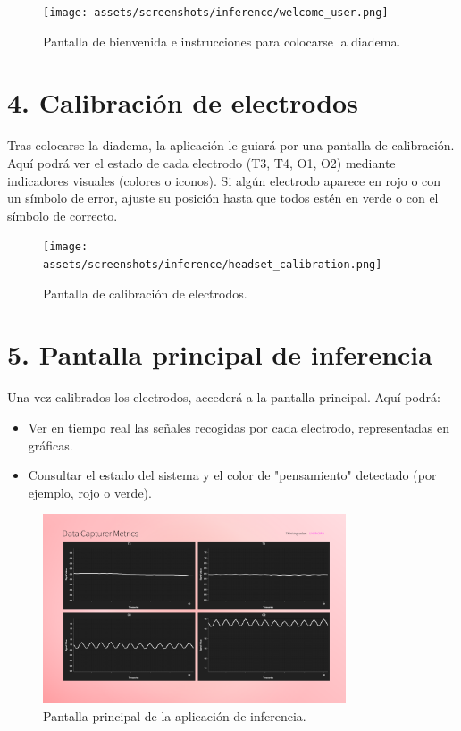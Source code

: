 \begin{figure}[h!]
    \centering
    \texttt{[image: assets/screenshots/inference/welcome\_user.png]}
    \caption{Pantalla de bienvenida e instrucciones para colocarse la diadema.}
\end{figure}

\section*{4. Calibración de electrodos}
Tras colocarse la diadema, la aplicación le guiará por una pantalla de calibración. Aquí podrá ver el estado de cada electrodo (T3, T4, O1, O2) mediante indicadores visuales (colores o iconos). Si algún electrodo aparece en rojo o con un símbolo de error, ajuste su posición hasta que todos estén en verde o con el símbolo de correcto.

\begin{figure}[h!]
    \centering
    \texttt{[image: assets/screenshots/inference/headset\_calibration.png]}
    \caption{Pantalla de calibración de electrodos.}
\end{figure}

\section*{5. Pantalla principal de inferencia}
Una vez calibrados los electrodos, accederá a la pantalla principal. Aquí podrá:
\begin{itemize}
    \item Ver en tiempo real las señales recogidas por cada electrodo, representadas en gráficas.
    \item Consultar el estado del sistema y el color de "pensamiento" detectado (por ejemplo, rojo o verde).
\end{itemize}

\begin{figure}[h!]
    \centering
    \includegraphics[width=0.8\textwidth]{assets/screenshots/inference/main_window.png}
    \caption{Pantalla principal de la aplicación de inferencia.}
\end{figure}

